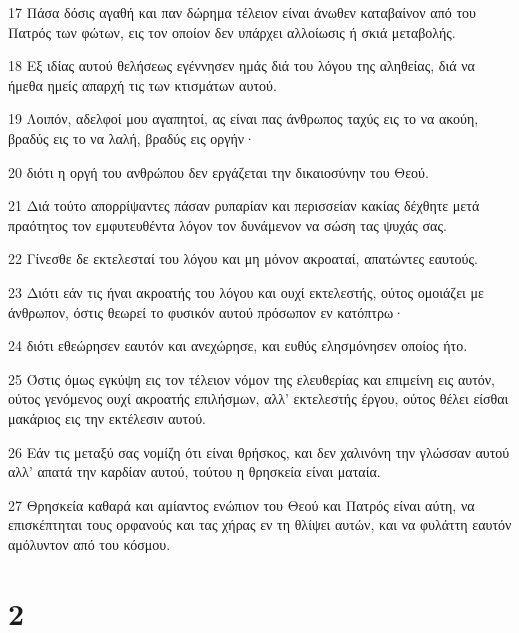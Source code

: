 \par 17 Πάσα δόσις αγαθή και παν δώρημα τέλειον είναι άνωθεν καταβαίνον από του Πατρός των φώτων, εις τον οποίον δεν υπάρχει αλλοίωσις ή σκιά μεταβολής.
\par 18 Εξ ιδίας αυτού θελήσεως εγέννησεν ημάς διά του λόγου της αληθείας, διά να ήμεθα ημείς απαρχή τις των κτισμάτων αυτού.
\par 19 Λοιπόν, αδελφοί μου αγαπητοί, ας είναι πας άνθρωπος ταχύς εις το να ακούη, βραδύς εις το να λαλή, βραδύς εις οργήν·
\par 20 διότι η οργή του ανθρώπου δεν εργάζεται την δικαιοσύνην του Θεού.
\par 21 Διά τούτο απορρίψαντες πάσαν ρυπαρίαν και περισσείαν κακίας δέχθητε μετά πραότητος τον εμφυτευθέντα λόγον τον δυνάμενον να σώση τας ψυχάς σας.
\par 22 Γίνεσθε δε εκτελεσταί του λόγου και μη μόνον ακροαταί, απατώντες εαυτούς.
\par 23 Διότι εάν τις ήναι ακροατής του λόγου και ουχί εκτελεστής, ούτος ομοιάζει με άνθρωπον, όστις θεωρεί το φυσικόν αυτού πρόσωπον εν κατόπτρω·
\par 24 διότι εθεώρησεν εαυτόν και ανεχώρησε, και ευθύς ελησμόνησεν οποίος ήτο.
\par 25 Όστις όμως εγκύψη εις τον τέλειον νόμον της ελευθερίας και επιμείνη εις αυτόν, ούτος γενόμενος ουχί ακροατής επιλήσμων, αλλ' εκτελεστής έργου, ούτος θέλει είσθαι μακάριος εις την εκτέλεσιν αυτού.
\par 26 Εάν τις μεταξύ σας νομίζη ότι είναι θρήσκος, και δεν χαλινόνη την γλώσσαν αυτού αλλ' απατά την καρδίαν αυτού, τούτου η θρησκεία είναι ματαία.
\par 27 Θρησκεία καθαρά και αμίαντος ενώπιον του Θεού και Πατρός είναι αύτη, να επισκέπτηται τους ορφανούς και τας χήρας εν τη θλίψει αυτών, και να φυλάττη εαυτόν αμόλυντον από του κόσμου.

\chapter{2}

